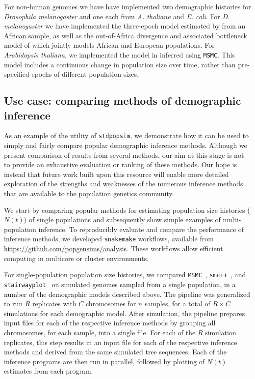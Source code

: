 \documentclass[12pt,halfline,a4paper]{ouparticle}
\newcommand{\stdpopsim}{\texttt{stdpopsim}\xspace}
\newcommand{\MSMC}{\texttt{MSMC}\xspace}
\newcommand{\smcpp}{\texttt{smc++}\xspace}
\newcommand{\stairwayplot}{\texttt{stairwayplot}\xspace}
\begin{document}
For non-human genomes we have have implemented two demographic histories for
\emph{Drosophila melanogaster} and one each from \emph{A. thaliana} and \emph{E. coli}.
For \emph{D. melanogaster} we have implemented the three-epoch model estimated by \cite{sheehan2016deep} from
an African sample, as well as the out-of-Africa divergence
and associated bottleneck model of \cite{li2006inferring} which jointly models African
and European populations. For \emph{Arabidopsis thaliana}, we implemented the
model in \cite{durvasula2017african} inferred using \MSMC. This model includes
a continuous change in population size over time, rather than pre-specified epochs of different
population sizes.


\subsection*{Use case: comparing methods of demographic inference}
As an example of the utility of \stdpopsim, we demonstrate how it can be used
to simply and fairly compare popular demographic inference methods.
Although we present comparison of results from several
methods, our aim at this stage is not to provide an exhaustive
evaluation or ranking of these methods. Our hope is instead that future work built upon this resource
will enable more detailed exploration of the strengths and weaknesses of the numerous
inference methods that are available to the population genetics community.

We start by comparing popular methods for estimating
population size histories ($N(t)$) of single populations and subsequently
show simple examples of multi-population inference.
To reproducibly evaluate and compare the performance of inference methods, we developed
\texttt{snakemake} \citep{koster2012snakemake} workflows,
available from \url{https://github.com/popgensims/analysis}.
These workflows allow efficient computing in multicore or cluster environments.

For single-population population size histories, we compared
\MSMC~\citep{schiffels2014inferring}, \smcpp~\citep{terhorst2017robust}, and
\stairwayplot~\citep{liu2015exploring}
 on simulated genomes sampled from a single population,
in a number of the demographic models described above. The pipeline was generalized to
run $R$ replicates with $C$ chromosomes for $n$ samples, for a total of $R \times C$
simulations for each demographic model. After simulation, the pipeline prepares
input files for each of the respective inference methods by grouping all
chromosomes, for each sample, into a single file. For each of the $R$ simulation replicates, this step results in an
input file for each of the
respective inference methods and derived from the same simulated tree sequences.
Each of the inference programs are then run in parallel, followed by plotting of
$N(t)$ estimates from each program.
\end{document}
